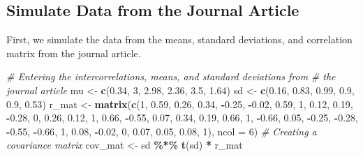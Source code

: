 \documentclass[
  11pt,
]{book}
\newenvironment{Shaded}{\begin{snugshade}}{\end{snugshade}}
\newcommand{\AttributeTok}[1]{\textcolor[rgb]{0.27,0.27,0.27}{#1}}
\newcommand{\CommentTok}[1]{\textcolor[rgb]{0.37,0.37,0.37}{\textit{#1}}}
\newcommand{\DecValTok}[1]{\textcolor[rgb]{0.06,0.06,0.06}{#1}}
\newcommand{\FloatTok}[1]{\textcolor[rgb]{0.06,0.06,0.06}{#1}}
\newcommand{\FunctionTok}[1]{\textcolor[rgb]{0.27,0.27,0.27}{\textbf{#1}}}
\newcommand{\NormalTok}[1]{#1}
\newcommand{\OtherTok}[1]{\textcolor[rgb]{0.37,0.37,0.37}{#1}}
\newcommand{\SpecialCharTok}[1]{\textcolor[rgb]{0.43,0.43,0.43}{\textbf{#1}}}
\begin{document}
\hypertarget{simulate-data-from-the-journal-article}{%
\subsection{Simulate Data from the Journal Article}\label{simulate-data-from-the-journal-article}}

First, we simulate the data from the means, standard deviations, and correlation matrix from the journal article.

\begin{Shaded}
\begin{Highlighting}[]
\CommentTok{\# Entering the intercorrelations, means, and standard deviations from}
\CommentTok{\# the journal article}
\NormalTok{mu }\OtherTok{\textless{}{-}} \FunctionTok{c}\NormalTok{(}\FloatTok{0.34}\NormalTok{, }\DecValTok{3}\NormalTok{, }\FloatTok{2.98}\NormalTok{, }\FloatTok{2.36}\NormalTok{, }\FloatTok{3.5}\NormalTok{, }\FloatTok{1.64}\NormalTok{)}
\NormalTok{sd }\OtherTok{\textless{}{-}} \FunctionTok{c}\NormalTok{(}\FloatTok{0.16}\NormalTok{, }\FloatTok{0.83}\NormalTok{, }\FloatTok{0.99}\NormalTok{, }\FloatTok{0.9}\NormalTok{, }\FloatTok{0.9}\NormalTok{, }\FloatTok{0.53}\NormalTok{)}
\NormalTok{r\_mat }\OtherTok{\textless{}{-}} \FunctionTok{matrix}\NormalTok{(}\FunctionTok{c}\NormalTok{(}\DecValTok{1}\NormalTok{, }\FloatTok{0.59}\NormalTok{, }\FloatTok{0.26}\NormalTok{, }\FloatTok{0.34}\NormalTok{, }\SpecialCharTok{{-}}\FloatTok{0.25}\NormalTok{, }\SpecialCharTok{{-}}\FloatTok{0.02}\NormalTok{, }\FloatTok{0.59}\NormalTok{, }\DecValTok{1}\NormalTok{, }\FloatTok{0.12}\NormalTok{, }\FloatTok{0.19}\NormalTok{,}
    \SpecialCharTok{{-}}\FloatTok{0.28}\NormalTok{, }\DecValTok{0}\NormalTok{, }\FloatTok{0.26}\NormalTok{, }\FloatTok{0.12}\NormalTok{, }\DecValTok{1}\NormalTok{, }\FloatTok{0.66}\NormalTok{, }\SpecialCharTok{{-}}\FloatTok{0.55}\NormalTok{, }\FloatTok{0.07}\NormalTok{, }\FloatTok{0.34}\NormalTok{, }\FloatTok{0.19}\NormalTok{, }\FloatTok{0.66}\NormalTok{, }\DecValTok{1}\NormalTok{, }\SpecialCharTok{{-}}\FloatTok{0.66}\NormalTok{,}
    \FloatTok{0.05}\NormalTok{, }\SpecialCharTok{{-}}\FloatTok{0.25}\NormalTok{, }\SpecialCharTok{{-}}\FloatTok{0.28}\NormalTok{, }\SpecialCharTok{{-}}\FloatTok{0.55}\NormalTok{, }\SpecialCharTok{{-}}\FloatTok{0.66}\NormalTok{, }\DecValTok{1}\NormalTok{, }\FloatTok{0.08}\NormalTok{, }\SpecialCharTok{{-}}\FloatTok{0.02}\NormalTok{, }\DecValTok{0}\NormalTok{, }\FloatTok{0.07}\NormalTok{, }\FloatTok{0.05}\NormalTok{, }\FloatTok{0.08}\NormalTok{,}
    \DecValTok{1}\NormalTok{), }\AttributeTok{ncol =} \DecValTok{6}\NormalTok{)}
\CommentTok{\# Creating a covariance matrix}
\NormalTok{cov\_mat }\OtherTok{\textless{}{-}}\NormalTok{ sd }\SpecialCharTok{\%*\%} \FunctionTok{t}\NormalTok{(sd) }\SpecialCharTok{*}\NormalTok{ r\_mat}


\end{Highlighting}
\end{Shaded}
\end{document}
